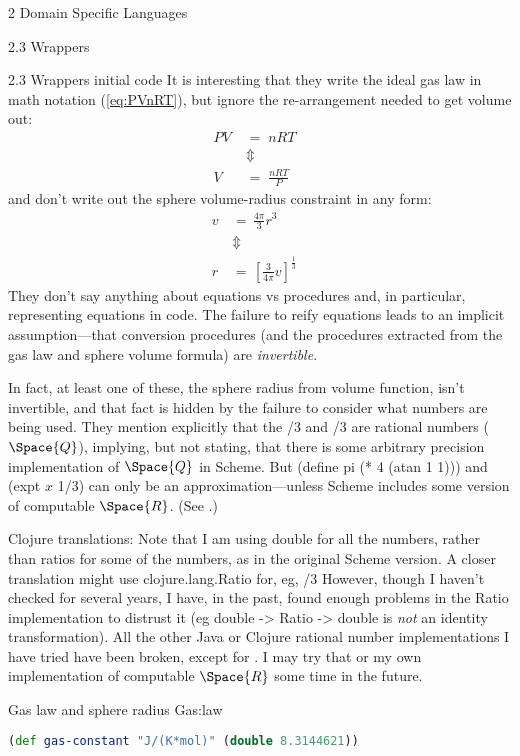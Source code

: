 \documentclass[12pt]{PalisadesLakesBook}
\begin{document}
\begin{plSection}{2 Domain Specific Languages}
\begin{plSection}{2.3 Wrappers}
\begin{plSection}{2.3 Wrappers initial code}
It is interesting that they write the ideal gas law 
in math notation (\cref{eq:PVnRT}),
but ignore the re-arrangement needed to get volume out:
\begin{align}
\label{eq:PVnRT}
PV \; & = \; nRT \\
& \Updownarrow & \nonumber \\
V \; & = \; \frac{nRT}{P} 
\end{align}
and don't write out the sphere volume-radius constraint 
in any form:
\begin{align}
v \, & = \, \frac{4\pi}{3} r^{3} \\  
& \Updownarrow & \nonumber \\
r \, & = \, \left[ \frac{3}{4\pi} v\right]^{\frac{1}{3}}
\end{align}
They don't say anything about equations vs procedures
and, in particular, representing equations in code.
The failure to reify equations leads to an implicit
assumption---that conversion procedures 
(and the procedures extracted from the gas law and sphere volume
formula) are \emph{invertible}.

In fact, at least one of these, the sphere radius from volume
function, isn't invertible, and that fact is hidden by the
failure to consider what numbers are being used.
They mention explicitly that the {/3} 
and {/3}
are rational numbers ($\Space{Q}$), implying, but not stating,
that there is some arbitrary precision implementation of
$\Space{Q}$ in Scheme.
But {\schemeFont (define pi (* 4 (atan 1 1)))}
and {\schemeFont (expt $x$ 1/3)}
can only be an approximation---unless Scheme includes some version
of computable $\Space{R}$.
(See .)

Clojure translations:
Note that I am using {\javaFont double} for all the numbers,
rather than ratios for some of the numbers,
as in the original Scheme version.
A closer translation might use {\clojureFont clojure.lang.Ratio}
for, eg, {/3}
However, though I haven't checked for several years,
I have, in the past, found enough problems in the 
{\clojureFont Ratio} implementation to distrust it
(eg {\clojureFont double -> Ratio -> double} is \emph{not}
an identity transformation).
All the other Java or Clojure rational number implementations
I have tried have been broken, except for 
.
I may try that or my own implementation 
of computable $\Space{R}$ some time in the future.
\begin{plListing}
{Gas law and sphere radius}
{Gas:law}
\begin{lstlisting}[language=clojure]
(def gas-constant "J/(K*mol)" (double 8.3144621))


\end{lstlisting}
\end{plListing}
\end{plSection}
\end{plSection}
\end{plSection}
\end{document}
